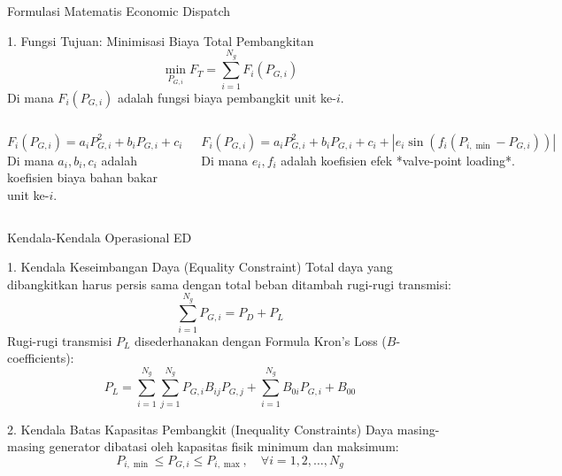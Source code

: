 \documentclass[10pt,aspectratio=169]{beamer}
\begin{document}
\begin{frame}{Formulasi Matematis Economic Dispatch}
    \begin{block}{1. Fungsi Tujuan: Minimisasi Biaya Total Pembangkitan}
        \[
            \min_{P_{G,i}} F_T = \sum_{i=1}^{N_g} F_i(P_{G,i})
        \]
        Di mana $F_i(P_{G,i})$ adalah fungsi biaya pembangkit unit ke-$i$.
    \end{block}

    \vspace{0.2cm}
    \begin{columns}
        \begin{tcolorbox}[colback=white,colframe=unibblue,title=\textbf{Fungsi Biaya Kuadratik Standar}]
            \[
                F_i(P_{G,i}) = a_i P_{G,i}^2 + b_i P_{G,i} + c_i
            \]
            Di mana $a_i, b_i, c_i$ adalah koefisien biaya bahan bakar unit ke-$i$.
        \end{tcolorbox}

        \begin{tcolorbox}[colback=white,colframe=red!80!black,title=\textbf{Fungsi Biaya dengan Valve-Point Effect}]
            \[
                F_i(P_{G,i}) = a_i P_{G,i}^2 + b_i P_{G,i} + c_i + |e_i \sin(f_i(P_{i,\min} - P_{G,i}))|
            \]
            Di mana $e_i, f_i$ adalah koefisien efek *valve-point loading*.
        \end{tcolorbox}
    \end{columns}
\end{frame}

\begin{frame}{Kendala-Kendala Operasional ED}
    \begin{block}{1. Kendala Keseimbangan Daya (Equality Constraint)}
        Total daya yang dibangkitkan harus persis sama dengan total beban ditambah rugi-rugi transmisi:
        \[
            \sum_{i=1}^{N_g} P_{G,i} = P_D + P_L
        \]
        Rugi-rugi transmisi $P_L$ disederhanakan dengan Formula Kron's Loss ($B$-coefficients):
        \[
            P_L = \sum_{i=1}^{N_g} \sum_{j=1}^{N_g} P_{G,i} B_{ij} P_{G,j} + \sum_{i=1}^{N_g} B_{0i} P_{G,i} + B_{00}
        \]
    \end{block}

    \begin{block}{2. Kendala Batas Kapasitas Pembangkit (Inequality Constraints)}
        Daya masing-masing generator dibatasi oleh kapasitas fisik minimum dan maksimum:
        \[
            P_{i,\min} \le P_{G,i} \le P_{i,\max}, \quad \forall i = 1, 2, \dots, N_g
        \]
    \end{block}
\end{frame}
\end{document}
